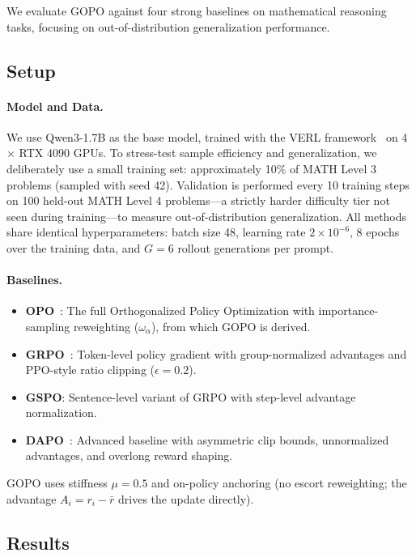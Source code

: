 \documentclass[11pt]{article}
\theoremstyle{definition}
\theoremstyle{remark}
\begin{document}
We evaluate GOPO against four strong baselines on mathematical reasoning tasks, focusing on out-of-distribution generalization performance.

\subsection{Setup}

\paragraph{Model and Data.} We use Qwen3-1.7B as the base model, trained with the VERL framework~\cite{Sheng2024HybridFlow} on 4$\times$ RTX 4090 GPUs. To stress-test sample efficiency and generalization, we deliberately use a small training set: approximately 10\% of MATH Level 3 problems (sampled with seed 42). Validation is performed every 10 training steps on 100 held-out MATH Level 4 problems---a strictly harder difficulty tier not seen during training---to measure out-of-distribution generalization. All methods share identical hyperparameters: batch size 48, learning rate $2 \times 10^{-6}$, 8 epochs over the training data, and $G=6$ rollout generations per prompt.

\paragraph{Baselines.}
\begin{itemize}[leftmargin=2em]
    \item \textbf{OPO}~\cite{Wang2025OPO}: The full Orthogonalized Policy Optimization with importance-sampling reweighting ($\omega_\alpha$), from which GOPO is derived.
    \item \textbf{GRPO}~\cite{Shao2024GRPO}: Token-level policy gradient with group-normalized advantages and PPO-style ratio clipping ($\epsilon = 0.2$).
    \item \textbf{GSPO}: Sentence-level variant of GRPO with step-level advantage normalization.
    \item \textbf{DAPO}~\cite{Yu2025DAPO}: Advanced baseline with asymmetric clip bounds, unnormalized advantages, and overlong reward shaping.
\end{itemize}
GOPO uses stiffness $\mu = 0.5$ and on-policy anchoring (no escort reweighting; the advantage $A_i = r_i - \bar{r}$ drives the update directly).

\subsection{Results}
\end{document}
